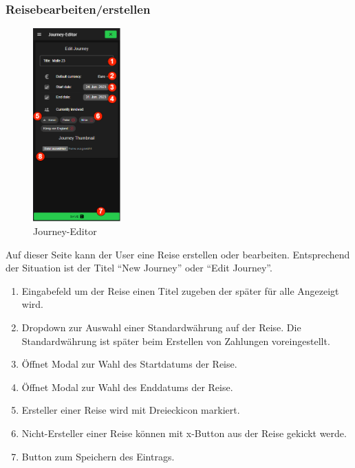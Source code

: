 \subsubsection{Reisebearbeiten/erstellen}\label{Journey-Editor}
\begin{figure}[H]
    \centering
    \includegraphics[width=0.3\textwidth]{img/pages_numbers/journey-editor.drawio}
    \caption[Journey-Editor]{Journey-Editor}
    \label{fig:Journey-Editor}
\end{figure}
Auf dieser Seite kann der User eine Reise erstellen oder bearbeiten. Entsprechend der Situation ist der Titel  "`New Journey"' oder "`Edit Journey"'.
\begin{enumerate}[label=\protect\circled{\arabic*}]
	\item Eingabefeld um der Reise einen Titel zugeben der später für alle Angezeigt wird.
	\item Dropdown zur Auswahl einer Standardwährung auf der Reise.
	Die Standardwährung ist später beim Erstellen von Zahlungen voreingestellt.
	\item Öffnet Modal zur Wahl des Startdatums der Reise.
	\item Öffnet Modal zur Wahl des Enddatums der Reise.
	\item Ersteller einer Reise wird mit Dreieckicon markiert.
	\item Nicht-Ersteller einer Reise können mit x-Button aus der Reise gekickt werde.
	\item Button zum Speichern des Eintrags.
\end{enumerate}

